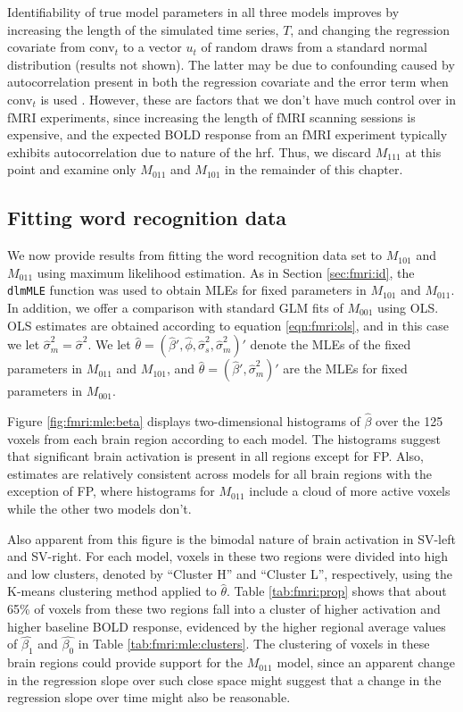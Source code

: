 Identifiability of true model parameters in all three models improves by increasing the length of the simulated time series, $T$, and changing the regression covariate from $\mbox{conv}_t$ to a vector $u_t$ of random draws from a standard normal distribution (results not shown). The latter may be due to confounding caused by autocorrelation present in both the regression covariate and the error term when $\mbox{conv}_t$ is used \citep{hodges:reich:confound:2010}. However, these are factors that we don't have much control over in fMRI experiments, since increasing the length of fMRI scanning sessions is expensive, and the expected BOLD response from an fMRI experiment typically exhibits autocorrelation due to nature of the hrf. Thus, we discard $M_{111}$ at this point and examine only $M_{011}$ and $M_{101}$ in the remainder of this chapter.

\subsection{Fitting word recognition data \label{sec:fmri:mle}}

We now provide results from fitting the word recognition data set to $M_{101}$ and $M_{011}$ using maximum likelihood estimation. As in Section \ref{sec:fmri:id}, the {\tt dlmMLE} function was used to obtain MLEs for fixed parameters in $M_{101}$ and $M_{011}$. In addition, we offer a comparison with standard GLM fits of $M_{001}$ using OLS. OLS estimates are obtained according to equation \eqref{eqn:fmri:ols}, and in this case we let $\hat{\sigma}^2_m = \hat{\sigma}^2$. We let $\hat{\theta} = (\hat{\beta}',\hat{\phi},\hat{\sigma}^2_s,\hat{\sigma}^2_m)'$ denote the MLEs of the fixed parameters in $M_{011}$ and $M_{101}$, and $\hat{\theta} = (\hat{\beta}',\hat{\sigma}^2_m)'$ are the MLEs for fixed parameters in $M_{001}$.

Figure \ref{fig:fmri:mle:beta} displays two-dimensional histograms of $\hat{\beta}$ over the 125 voxels from each brain region according to each model. The histograms suggest that significant brain activation is present in all regions except for FP. Also, estimates are relatively consistent across models for all brain regions with the exception of FP, where histograms for $M_{011}$ include a cloud of more active voxels while the other two models don't.

Also apparent from this figure is the bimodal nature of brain activation in SV-left and SV-right. For each model, voxels in these two regions were divided into high and low clusters, denoted by ``Cluster H'' and ``Cluster L'', respectively, using the K-means clustering method \citep{hartigan:wong:kmeans:1979} applied to $\hat{\theta}$. Table \ref{tab:fmri:prop} shows that about 65\% of voxels from these two regions fall into a cluster of higher activation and higher baseline BOLD response, evidenced by the higher regional average values of $\hat{\beta_1}$ and $\hat{\beta_0}$ in Table \ref{tab:fmri:mle:clusters}. The clustering of voxels in these brain regions could provide support for the $M_{011}$ model, since an apparent change in the regression slope over such close space might suggest that a change in the regression slope over time might also be reasonable.

